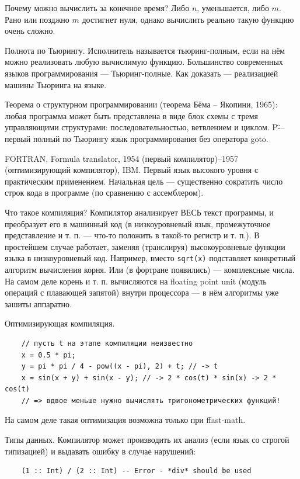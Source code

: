\documentclass{book}
\begin{document}
Почему можно вычислить за конечное время? Либо $n$, уменьшается, либо $m$.
Рано или позджно $m$ достигнет нуля, однако вычислить реально такую
функцию очень сложно.

Полнота по Тьюрингу. Исполнитель называется тьюринг-полным, если на нём можно
реализовать любую вычислимую функцию. Большинство современных языков
программирования --- Тьюринг-полные. Как доказать --- реализацией машины
Тьюринга на языке.

Теорема о структурном программировании (теорема Бёма -- Якопини, 1965): любая
программа может быть представлена в виде блок схемы с тремя управляющими
структурами: последовательностью, ветвлением и циклом. P\" --- первый полный
по Тьюрингу язык программирования без оператора goto.

FORTRAN, Formula translator, 1954 (первый компилятор)--1957 (оптимизирующий компилятор), IBM.
Первый язык высокого уровня с практическим применением. Начальная цель --- существенно сократить
число строк кода в программе (по сравнению с ассемблером).

Что такое компиляция? Компилятор анализирует ВЕСЬ текст программы, и преобразует его в машинный
код (в низкоуровневый язык, промежуточное представление и т. п. --- что-то положить в такой-то
регистр и т. п.). В простейшем случае работает,
заменяя (транслируя) высокоуровневые функции языка в низкоуровневый код. Например, вместо
\texttt{sqrt(x)}
подставляет конкретный алгоритм вычисления корня. Или (в фортране
появились) --- комплексные числа. На самом деле корень и т. п. вычисляются на floating point unit
(модуль операций с плавающей запятой) внутри процессора --- в нём алгоритмы уже зашиты аппаратно.

Оптимизирующая компиляция.
\begin{verbatim}
    // пусть t на этапе компиляции неизвестно
    x = 0.5 * pi;
    y = pi * pi / 4 - pow((x - pi), 2) + t; // -> t
    x = sin(x + y) + sin(x - y); // -> 2 * cos(t) * sin(x) -> 2 * cos(t)
    // => вдвое меньше нужно вычислять тригонометрических функций!
\end{verbatim}
На самом деле такая оптимизация возможна только при ffast-math.

Типы данных. Компилятор может производить их анализ (если язык со строгой типизацией) и выдавать
ошибку в случае нарушений:
\begin{verbatim}
    (1 :: Int) / (2 :: Int) -- Error - *div* should be used
\end{verbatim}
\end{document}
